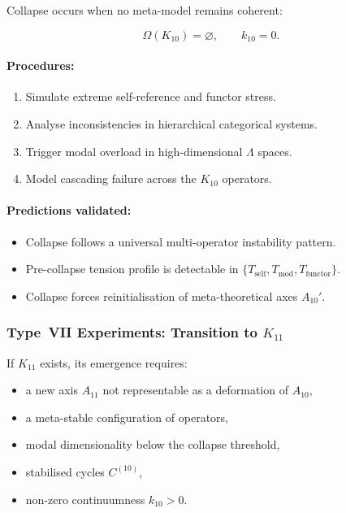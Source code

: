 Collapse occurs when no meta-model remains coherent:

\[
    \Omega(K_{10}) = \varnothing,\qquad k_{10} = 0.
\]

\paragraph{Procedures:}

\begin{enumerate}
    \item Simulate extreme self-reference and functor stress.
    \item Analyse inconsistencies in hierarchical categorical systems.
    \item Trigger modal overload in high-dimensional $\Lambda$ spaces.
    \item Model cascading failure across the $K_{10}$ operators.
\end{enumerate}

\paragraph{Predictions validated:}

\begin{itemize}
    \item Collapse follows a universal multi-operator instability pattern.
    \item Pre-collapse tension profile is detectable in 
          $\{T_{\mathrm{self}}, T_{\mathrm{mod}}, T_{\mathrm{functor}}\}$.
    \item Collapse forces reinitialisation of meta-theoretical axes 
          $A_{10}'$.
\end{itemize}



\subsubsection{Type~VII Experiments: Transition to $K_{11}$}

If $K_{11}$ exists, its emergence requires:

\begin{itemize}
    \item a new axis $A_{11}$ not representable as 
          a deformation of $A_{10}$,
    \item a meta-stable configuration of operators,
    \item modal dimensionality below the collapse threshold,
    \item stabilised cycles $C^{(10)}$,
    \item non-zero continuumness $k_{10} > 0$.
\end{itemize}

